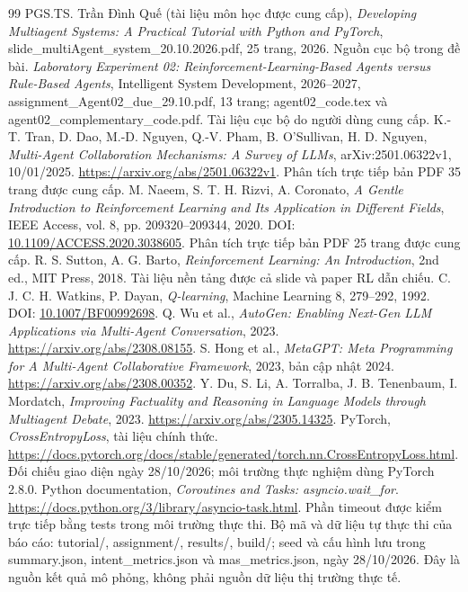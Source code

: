 \clearpage
{}
\begin{thebibliography}{99}
 PGS.TS. Trần Đình Quế (tài liệu môn học được cung cấp), \emph{Developing Multiagent Systems: A Practical Tutorial with Python and PyTorch}, slide\_multiAgent\_system\_20.10.2026.pdf, 25 trang, 2026. Nguồn cục bộ trong đề bài.
 \emph{Laboratory Experiment 02: Reinforcement-Learning-Based Agents versus Rule-Based Agents}, Intelligent System Development, 2026--2027, assignment\_Agent02\_due\_29.10.pdf, 13 trang; agent02\_code.tex và agent02\_complementary\_code.pdf. Tài liệu cục bộ do người dùng cung cấp.
 K.-T. Tran, D. Dao, M.-D. Nguyen, Q.-V. Pham, B. O'Sullivan, H. D. Nguyen, \emph{Multi-Agent Collaboration Mechanisms: A Survey of LLMs}, arXiv:2501.06322v1, 10/01/2025. \url{https://arxiv.org/abs/2501.06322v1}. Phân tích trực tiếp bản PDF 35 trang được cung cấp.
 M. Naeem, S. T. H. Rizvi, A. Coronato, \emph{A Gentle Introduction to Reinforcement Learning and Its Application in Different Fields}, IEEE Access, vol. 8, pp. 209320--209344, 2020. DOI: \href{https://doi.org/10.1109/ACCESS.2020.3038605}{10.1109/ACCESS.2020.3038605}. Phân tích trực tiếp bản PDF 25 trang được cung cấp.
 R. S. Sutton, A. G. Barto, \emph{Reinforcement Learning: An Introduction}, 2nd ed., MIT Press, 2018. Tài liệu nền tảng được cả slide và paper RL dẫn chiếu.
 C. J. C. H. Watkins, P. Dayan, \emph{Q-learning}, Machine Learning 8, 279--292, 1992. DOI: \href{https://doi.org/10.1007/BF00992698}{10.1007/BF00992698}.
 Q. Wu et al., \emph{AutoGen: Enabling Next-Gen LLM Applications via Multi-Agent Conversation}, 2023. \url{https://arxiv.org/abs/2308.08155}.
 S. Hong et al., \emph{MetaGPT: Meta Programming for A Multi-Agent Collaborative Framework}, 2023, bản cập nhật 2024. \url{https://arxiv.org/abs/2308.00352}.
 Y. Du, S. Li, A. Torralba, J. B. Tenenbaum, I. Mordatch, \emph{Improving Factuality and Reasoning in Language Models through Multiagent Debate}, 2023. \url{https://arxiv.org/abs/2305.14325}.
 PyTorch, \emph{CrossEntropyLoss}, tài liệu chính thức. \url{https://docs.pytorch.org/docs/stable/generated/torch.nn.CrossEntropyLoss.html}. Đối chiếu giao diện ngày 28/10/2026; môi trường thực nghiệm dùng PyTorch 2.8.0.
 Python documentation, \emph{Coroutines and Tasks: asyncio.wait\_for}. \url{https://docs.python.org/3/library/asyncio-task.html}. Phần timeout được kiểm trực tiếp bằng tests trong môi trường thực thi.
 Bộ mã và dữ liệu tự thực thi của báo cáo: tutorial/, assignment/, results/, build/; seed và cấu hình lưu trong summary.json, intent\_metrics.json và mas\_metrics.json, ngày 28/10/2026. Đây là nguồn kết quả mô phỏng, không phải nguồn dữ liệu thị trường thực tế.
\end{thebibliography}
